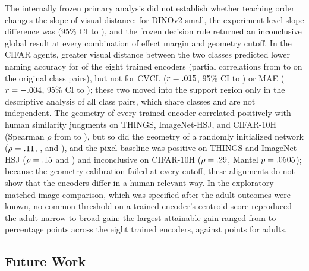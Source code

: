 \documentclass[11pt]{article}
\begin{document}
The internally frozen primary analysis did not establish whether teaching order changes the slope of visual distance: for DINOv2-small, the experiment-level slope difference was \VtOrdDelta{} (95\% CI \VtOrdLo{} to \VtOrdHi), and the frozen decision rule returned an inconclusive global result at every combination of effect margin and geometry cutoff. In the CIFAR agents, greater visual distance between the two classes predicted lower naming accuracy for \VtDSupportWord{} of the eight trained encoders (partial correlations from \VtDrMin{} to \VtDrMax{} on the \VtDN{} original class pairs), but not for CVCL ($r = .015$, 95\% CI \VtDCvclLo{} to \VtDCvclHi) or MAE ($r = -.004$, 95\% CI \VtDMaeLo{} to \VtDMaeHi); these two moved into the support region only in the descriptive analysis of all \VtDallN{} class pairs, which share classes and are not independent. The geometry of every trained encoder correlated positively with human similarity judgments on THINGS, ImageNet-HSJ, and CIFAR-10H (Spearman $\rho$ from \VtHoneMin{} to \VtHoneMax), but so did the geometry of a randomly initialized network ($\rho = .11$, \VtHoneRandHsj, and \VtHoneRandCten), and the pixel baseline was positive on THINGS and ImageNet-HSJ ($\rho = .15$ and \VtHonePixHsj) and inconclusive on CIFAR-10H ($\rho = .29$, Mantel $p = .0505$); because the geometry calibration failed at every cutoff, these alignments do not show that the encoders differ in a human-relevant way. In the exploratory matched-image comparison, which was specified after the adult outcomes were known, no common threshold on a trained encoder's centroid score reproduced the adult narrow-to-broad gain: the largest attainable gain ranged from \VtXJumpMin{} to \VtXJumpMax{} percentage points across the eight trained encoders, against \VtXJumpAdult{} points for adults.

\subsection{Future Work}
\end{document}
